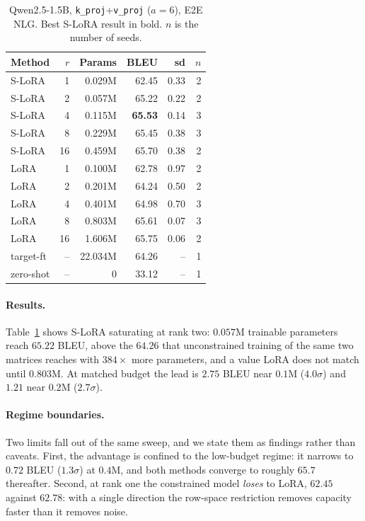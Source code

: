\documentclass{article}
\theoremstyle{remark}
\begin{document}
\begin{table}[t]\centering
\caption{Qwen2.5-1.5B, \texttt{k\_proj}+\texttt{v\_proj} ($a{=}6$), E2E NLG.
Best S-LoRA result in bold. $n$ is the number of seeds.}
\label{tab:e2e}
\begin{tabular}{lrrrrr}
\toprule
Method & $r$ & Params & BLEU & sd & $n$ \\
\midrule
S-LoRA    &1  & 0.029M & 62.45 & 0.33 & 2 \\
S-LoRA    &2  & 0.057M & 65.22 & 0.22 & 2 \\
S-LoRA    &4  & 0.115M & \textbf{65.53} & 0.14 & 3 \\
S-LoRA    &8  & 0.229M & 65.45 & 0.38 & 3 \\
S-LoRA    &16 & 0.459M & 65.70 & 0.38 & 2 \\
\midrule
LoRA      & 1  & 0.100M & 62.78 & 0.97 & 2 \\
LoRA      & 2  & 0.201M & 64.24 & 0.50 & 2 \\
LoRA      & 4  & 0.401M & 64.98 & 0.70 & 3 \\
LoRA      & 8  & 0.803M & 65.61 & 0.07 & 3 \\
LoRA      & 16 & 1.606M & 65.75 & 0.06 & 2 \\
\midrule
target-ft & -- & 22.034M & 64.26 & -- & 1 \\
zero-shot & -- & 0 & 33.12 & -- & 1 \\
\bottomrule
\end{tabular}
\end{table}

\paragraph{Results.}
Table~\ref{tab:e2e} shows S-LoRA saturating at rank two: $0.057$M trainable
parameters reach $65.22$ BLEU, above the $64.26$ that unconstrained training of
the same two matrices reaches with $384\times$ more parameters, and a value
LoRA does not match until $0.803$M. At matched budget the lead is $2.75$ BLEU
near $0.1$M ($4.0\sigma$) and $1.21$ near $0.2$M ($2.7\sigma$).

\paragraph{Regime boundaries.}
Two limits fall out of the same sweep, and we state them as findings rather
than caveats. First, the advantage is confined to the low-budget regime: it
narrows to $0.72$ BLEU ($1.3\sigma$) at $0.4$M, and both methods converge to
roughly $65.7$ thereafter. Second, at rank one the constrained model
\emph{loses} to LoRA, $62.45$ against $62.78$: with a single direction the
row-space restriction removes capacity faster than it removes noise.
\end{document}

